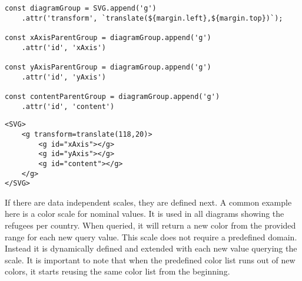 \begin{minipage}{0.9\linewidth}
\begin{lstlisting}[style=htmlCSSjs, captionpos=b, caption={JavaScript code to create the hierarchy as used in the bar chart. The first line adds a new group element to the main SVG container using the \texttt{append} command. The newly added group element is saved in a constant for later references. Furthermore in line two an attribute is added to the new group element using the \texttt{attr} command and method chaining. It moves the group element from the left and top to allign with the margin definition. In each of the lines four, seven and ten, another group element is added. They are added to the previously created group element. They are all stored in constants for later reference and are provided with ID's for easier identification and debugging.}, label={lst:hierarchy_creation}]
const diagramGroup = SVG.append('g')
    .attr('transform', `translate(${margin.left},${margin.top})`);

const xAxisParentGroup = diagramGroup.append('g')
    .attr('id', 'xAxis')

const yAxisParentGroup = diagramGroup.append('g')
    .attr('id', 'yAxis')

const contentParentGroup = diagramGroup.append('g')
    .attr('id', 'content')
\end{lstlisting}
\begin{lstlisting}[style=htmlCSSjs, captionpos=b, caption={The HTML structure which results from the JavaScript code in listing \ref{lst:hierarchy_creation}. The resulting tree structure clearly separates the different aspects of the diagram. Using a hierarchical approach makes not only later selections easier, but also increases human readability and simplifies debugging.}, label={lst:hierarchy_result}]
<SVG>
    <g transform=translate(118,20)>
        <g id="xAxis"></g>
        <g id="yAxis"></g>
        <g id="content"></g>
    </g>
</SVG>
    \end{lstlisting}
\end{minipage}

If there are data independent scales, they are defined next. A common example here is a color scale for nominal values. It is used in all diagrams showing the refugees per country. When queried, it will return a new color from the provided range for each new query value. This scale does not require a predefined domain. Instead it is dynamically defined and extended with each new value querying the scale. It is important to note that when the predefined color list runs out of new colors, it starts reusing the same color list from the beginning.

